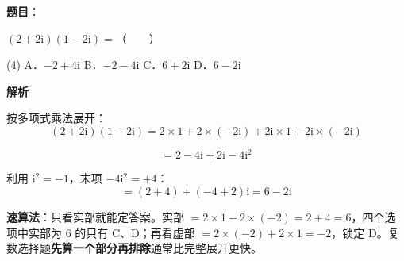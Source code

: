 \begin{answer}

\textbf{题目}：

$(2+2\mathrm i)(1-2\mathrm i)=$\mbox{（　　）}

\begin{gkopts}(4)
\task A．$-2+4\mathrm i$
\task B．$-2-4\mathrm i$
\task C．$6+2\mathrm i$
\task D．$6-2\mathrm i$
\end{gkopts}

\textbf{解析}

按多项式乘法展开：
\nopagebreak[4]
\[(2+2\mathrm i)(1-2\mathrm i)=2\times1+2\times(-2\mathrm i)+2\mathrm i\times1+2\mathrm i\times(-2\mathrm i)\]

\nopagebreak[4]
\[=2-4\mathrm i+2\mathrm i-4\mathrm i^{2}\]

利用 $\mathrm i^{2}=-1$，末项 $-4\mathrm i^{2}=+4$：
\nopagebreak[4]
\[=(2+4)+(-4+2)\mathrm i=6-2\mathrm i\]

\begin{gktip}
\textbf{速算法}：只看实部就能定答案。实部 $=2\times1-2\times(-2)=2+4=6$，四个选项中实部为 $6$ 的只有 C、D；再看虚部 $=2\times(-2)+2\times1=-2$，锁定 D。复数选择题\textbf{先算一个部分再排除}通常比完整展开更快。
\end{gktip}


\par\medskip

\end{answer}
